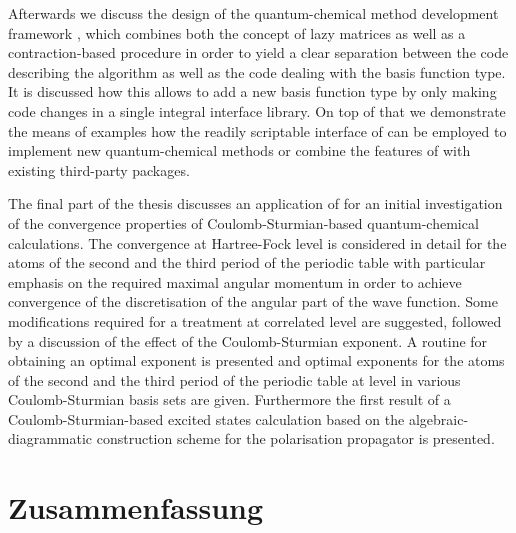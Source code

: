 Afterwards we discuss the design of the quantum-chemical method
development framework \molsturm,
which combines both the concept of lazy matrices
as well as a contraction-based \SCF procedure
in order to yield a clear separation between the code describing
the \SCF algorithm as well as the code dealing with the basis function type.
It is discussed how this allows to add a new basis function type
by only making code changes in a single integral interface library.
On top of that we demonstrate the means of examples
how the readily scriptable interface of \molsturm
can be employed to implement new quantum-chemical methods
or combine the features of \molsturm with existing third-party packages.

The final part of the thesis discusses an application of \molsturm
for an initial investigation of the convergence properties
of Coulomb-Sturmian-based quantum-chemical calculations.
The convergence at Hartree-Fock level is considered
in detail for the atoms of the second and the third period of the periodic table
with particular emphasis on the required
maximal angular momentum in order to achieve convergence
of the discretisation of the angular part of the wave function.
Some modifications required for a treatment at correlated level are suggested,
followed by a discussion of the effect of the Coulomb-Sturmian exponent.
A routine for obtaining an optimal exponent is presented
and optimal exponents for the atoms of the
second and the third period of the periodic table at \HF level in various
Coulomb-Sturmian basis sets are given.
Furthermore the first result of a Coulomb-Sturmian-based excited
states calculation based on the algebraic-diagrammatic construction
scheme for the polarisation propagator is presented.


%
%
\chapter*{Zusammenfassung}
